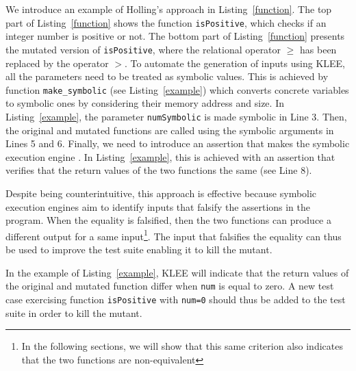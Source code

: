 We introduce an example of Holling's approach in Listing~\ref{function}. The top part of Listing~\ref{function} shows the function \texttt{isPositive}, which checks if an integer number is positive or not. The bottom part of Listing~\ref{function} presents the mutated version of \texttt{isPositive}, where the relational operator $\geq$ has been replaced by the operator $>$.
To automate the generation of inputs using KLEE, all the parameters need to be treated as symbolic values.
This is achieved by function \texttt{make\_symbolic} (see Listing~\ref{example}) which converts concrete variables to symbolic ones by considering their memory address and size. 
In Listing~\ref{example}, the parameter \texttt{numSymbolic} is made symbolic in Line 3. Then, the original and mutated functions are called using the symbolic arguments in Lines 5 and 6.
Finally, we need to introduce an assertion that makes the symbolic execution engine . 
In Listing~\ref{example}, this is achieved with an assertion that verifies that the return values of the two functions the same (see Line 8). 

Despite being counterintuitive, this approach is effective because symbolic execution engines aim to identify inputs that falsify the assertions in the program. 
When the equality is falsified, then the two functions can produce a different output for a same input\footnote{In the following sections, we will show that this same criterion also indicates that the two functions are non-equivalent}.
The input that falsifies the equality can thus be used to improve the test suite enabling it to kill the mutant.

In the example of Listing~\ref{example}, KLEE will indicate that the return values of the original and mutated function differ when \texttt{num} is equal to zero.
A new test case exercising function \texttt{isPositive} with \texttt{num=0} should thus be added to the test suite in order to kill the mutant.

